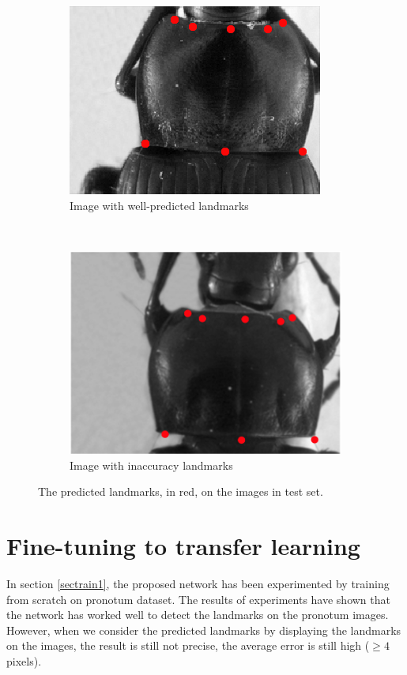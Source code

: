 \documentclass[10pt]{article}
\begin{document}
\begin{figure}[htbp]
    \centering
    \begin{subfigure}[t]{0.25\textwidth}
        \centering
        \includegraphics[scale=1.5]{images/fn_accuracy}
        \caption{\small{Image with well-predicted landmarks}}
        \label{figsub1}
    \end{subfigure}%
    ~ 
    \begin{subfigure}[t]{0.25\textwidth}
        \centering
        \includegraphics[scale=.65]{images/plandmark2}
        \caption{\small{Image with inaccuracy landmarks}}
        \label{figsub2}
    \end{subfigure}
    \caption{\small{The predicted landmarks, in red,  on the images in test set.}}
    \label{figrsexample}
\end{figure}

\section{Fine-tuning to transfer learning}
\label{secimproving}
In section \ref{sectrain1}, the proposed network has been experimented
by training from scratch on pronotum dataset. The results of
experiments have shown that the network has worked well to detect the
landmarks on the pronotum images. However, when we consider the
predicted landmarks by displaying the landmarks on the images, the
result is still not precise, the average error is still high ($\geq 4$
pixels).
\end{document}
